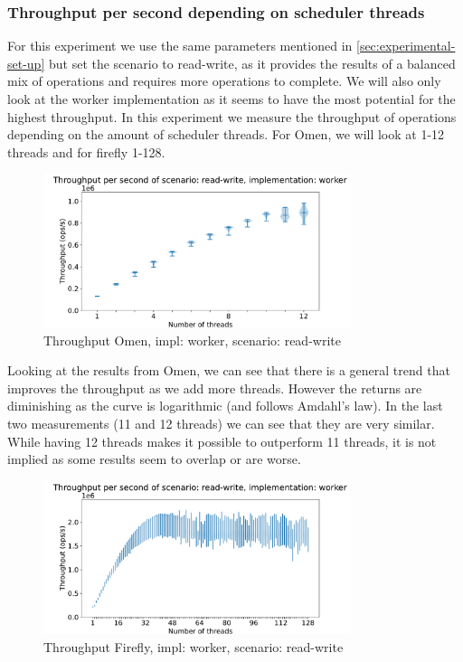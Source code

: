 \documentclass{article}
\begin{document}
\subsubsection{Throughput per second depending on scheduler threads}
\label{sec:throughput-per-second-depending-on-scheduler-threads}
For this experiment we use the same parameters mentioned in
\autoref{sec:experimental-set-up} but set the scenario to read-write, as it
provides the results of a balanced mix of operations and requires more
operations to complete. We will also only look at the worker implementation as
it seems to have the most potential for the highest throughput. In this experiment we measure the throughput of
operations depending on the amount of scheduler threads. For Omen, we will look
at 1-12 threads and for firefly 1-128.
\begin{figure}[H]
	\centering
	\includegraphics[width=0.8\textwidth]{violinplots/omen/throughput-per-second-of-scenario-read-write-implementation-worker-violinplot.pdf}
	\caption{Throughput Omen, impl: worker, scenario: read-write}
	\label{fig:throughput-omen-read-write-depend-threads}
\end{figure}
Looking at the results from Omen, we can see that there is a general trend that
improves the throughput as we add more threads. However the returns are
diminishing as the curve is logarithmic (and follows Amdahl's law). In the last two measurements (11 and 12
threads) we can see that they are very similar. While having 12 threads makes it
possible to outperform 11 threads, it is not implied as some results seem to
overlap or are worse.
\begin{figure}[H]
	\centering
	\includegraphics[width=0.8\textwidth]{violinplots/firefly/throughput-per-second-of-scenario-read-write-implementation-worker-violinplot.pdf}
	\caption{Throughput Firefly, impl: worker, scenario: read-write}
	\label{fig:throughput-firefly-read-write-depend-threads}
\end{figure}
\end{document}
